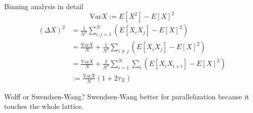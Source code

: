 \documentclass[]{beamer}
\begin{document}
\begin{frame}{Binning analysis in detail}
\[ \text{Var} X := E \left[ X^2 \right] - E \left[ X \right]^2 \]
\begin{align*}
(\Delta X)^2 &= \frac{1}{N^2} \sum\limits_{i,j=1}^N \left( E \left[ X_i X_j \right] - E \left[ X \right]^2 \right) \\
&= \frac{\text{Var}X}{N}+\frac{1}{N^2}\sum\limits_{i\neq j} \left( E \left[X_i X_j \right] - E \left[ X \right]^2 \right) \\
&= \frac{\text{Var}X}{N}+\frac{2}{N^2}\sum\limits_{i=1}^N \sum\limits_t \left( E\left[X_i X_{i+t} \right] - E \left[ X \right]^2 \right) \\
&:= \frac{\text{Var}X}{N}\left(1+2\tau_X\right)
\end{align*}
\end{frame}

\begin{frame}{Wolff or Swendsen-Wang?}
Swendsen-Wang better for parallelization because it touches the whole lattice.
\note{ }
\end{frame}
\end{document}
